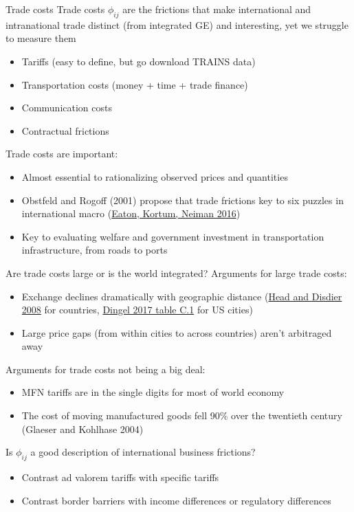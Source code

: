 \documentclass[10pt,notes=hide,aspectratio=169]{beamer}
\begin{document}
\begin{frame}{Trade costs}
Trade costs $\phi_{ij}$ are the frictions that make international and intranational trade distinct (from integrated GE) and interesting, yet we struggle to measure them
\begin{itemize}
	\item Tariffs (easy to define, but go download TRAINS data)
	\item Transportation costs (money + time + trade finance)
	\item Communication costs
	\item Contractual frictions
\end{itemize}
Trade costs are important:
\begin{itemize}
	\item Almost essential to rationalizing observed prices and quantities
	\item Obstfeld and Rogoff (2001) propose that trade frictions key to six puzzles in international macro (\href{https://www.sciencedirect.com/science/article/pii/S0165188916301014}{Eaton, Kortum, Neiman 2016})
	\item Key to evaluating welfare and government investment in transportation infrastructure, from roads to ports
\end{itemize}
\end{frame}
\begin{frame}{Are trade costs large or is the world integrated?}
Arguments for large trade costs:
\begin{itemize}
	\item Exchange declines dramatically with geographic distance ({\small \href{https://www.mitpressjournals.org/doi/10.1162/rest.90.1.37}{Head and Disdier 2008} for countries, \href{http://faculty.chicagobooth.edu/jonathan.dingel/research/thedeterminantsofqualityspecialization.pdf}{Dingel 2017 table C.1} for US cities})
	\item Large price gaps (from within cities to across countries) aren't arbitraged away
\end{itemize}
Arguments for trade costs not being a big deal:
\begin{itemize}
	\item MFN tariffs are in the single digits for most of world economy
	\item The cost of moving manufactured goods fell 90\% over the twentieth century (Glaeser and Kohlhase 2004)
\end{itemize}
Is $\phi_{ij}$ a good description of international business frictions?
\begin{itemize}
	\item Contrast ad valorem tariffs with specific tariffs
	\item Contrast border barriers with income differences or regulatory differences
\end{itemize}
\end{frame}
\end{document}
